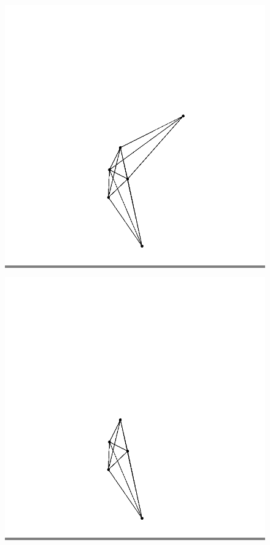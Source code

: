 \documentclass{article}
\begin{document}
\begin{figure}
\begin{minipage}{0.2\textwidth}
            \end{minipage}
            \hspace{\fill}
            \begin{minipage}{0.2\textwidth}
            \colorbox{gray}{\includegraphics[width=\linewidth]{./images/slvo-14.png}}
            \end{minipage}
            \hspace{\fill}
            \begin{minipage}{0.2\textwidth}
            \colorbox{gray}{\includegraphics[width=\linewidth]{./images/slvo-15.png}}

\end{minipage}
\end{figure}
\end{document}
